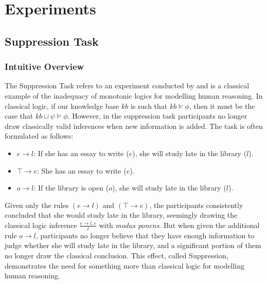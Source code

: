 \chapter{Experiments} \label{chp:experiments}
\section{Suppression Task} \label{sec:sup}
\subsection{Intuitive Overview} \label{ssec:sup_intuition}
The Suppression Task refers to an experiment conducted by \cite{byrne1989suppressing} and is a classical example of the inadequacy of monotonic logics for modelling human reasoning. In classical logic, if our knowledge base $kb$ is such that $kb \models \phi$, then it must be the case that $kb \cup \psi \models \phi$. However, in the suppression task participants no longer draw classically valid inferences when new information is added. The task is often formulated as follows:

\begin{itemize}
\item $e \rightarrow l$: If she has an essay to write ($e$), she will study late in the library ($l$).
\item $\top \rightarrow e$: She has an essay to write ($e$).
\item $o\rightarrow l$: If the library is open ($o$), she will study late in the library ($l$).
\end{itemize}

Given only the rules $(e \rightarrow l)$ and $(\top \rightarrow e)$, the participants consistently concluded that she would study late in the library, seemingly drawing the classical logic inference $\frac{e \rightarrow l, e}{l}$ with \textit{modus ponens}. But when given the additional rule $o\rightarrow l$, participants no longer believe that they have enough information to judge whether she will study late in the library, and a significant portion of them no longer draw the classical conclusion. This effect, called Suppression, demonstrates the need for something more than classical logic for modelling human reasoning.

